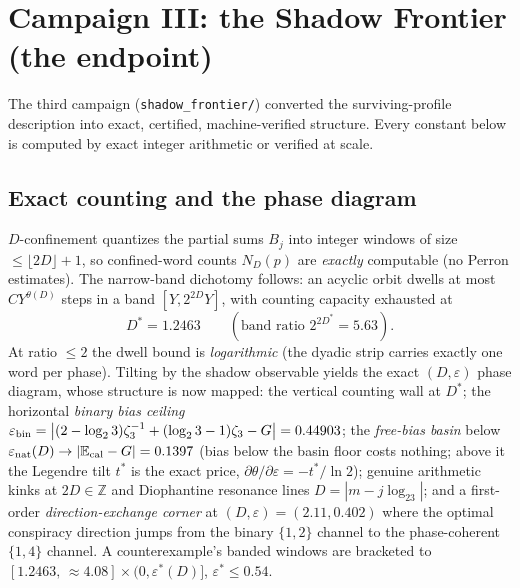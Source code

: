 \documentclass[11pt]{article}
\newcommand{\Z}{\mathbb Z}
\newcommand{\E}{\mathbb E}
\begin{document}
\section{Campaign III: the Shadow Frontier (the endpoint)}

The third campaign (\texttt{shadow\_frontier/}) converted the
surviving-profile description into exact, certified, machine-verified
structure.  Every constant below is computed by exact integer
arithmetic or verified at scale.

\subsection{Exact counting and the phase diagram}
$D$-confinement quantizes the partial sums $B_j$ into integer windows
of size $\le\lfloor2D\rfloor+1$, so confined-word counts $N_D(p)$ are
\emph{exactly} computable (no Perron estimates).  The narrow-band
dichotomy follows: an acyclic orbit dwells at most $CY^{\theta(D)}$
steps in a band $[Y,2^{2D}Y]$, with counting capacity exhausted at
\[
  D^*=1.2463\qquad(\text{band ratio }2^{2D^*}=5.63).
\]
At ratio $\le2$ the dwell bound is \emph{logarithmic} (the dyadic
strip carries exactly one word per phase).  Tilting by the shadow
observable yields the exact $(D,\varepsilon)$ phase diagram, whose
structure is now mapped: the vertical counting wall at $D^*$; the
horizontal \emph{binary bias ceiling}
$\varepsilon_{\rm bin}=\bigl|(2-\log_23)\zeta_3^{-1}+(\log_23-1)\zeta_3-G\bigr|
=0.44903$; the \emph{free-bias basin} below
$\varepsilon_{\rm nat}(D)\to|\E_{\rm cal}-G|=0.1397$ (bias below the
basin floor costs nothing; above it the Legendre tilt $t^*$ is the
exact price, $\partial\theta/\partial\varepsilon=-t^*/\ln2$); genuine
arithmetic kinks at $2D\in\Z$ and Diophantine resonance lines
$D=|m-j\log_23|$; and a first-order \emph{direction-exchange corner}
at $(D,\varepsilon)=(2.11,0.402)$ where the optimal conspiracy
direction jumps from the binary $\{1,2\}$ channel to the
phase-coherent $\{1,4\}$ channel.  A counterexample's banded windows
are bracketed to $[1.2463,\,{\approx}4.08]\times(0,\varepsilon^*(D)]$,
$\varepsilon^*\le0.54$.
\end{document}
